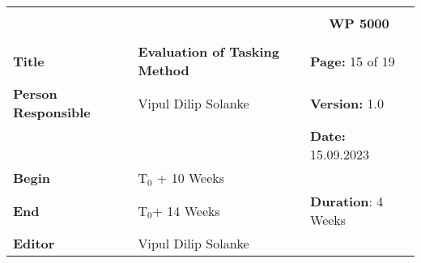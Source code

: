 \begin{table}[!h]
  \begin{center}
    \begin{tabular}{|p{35mm}||p{55mm}|p{50mm}||p{40mm}|}
      \hline
      \multicolumn{3}{|l||}{\textbf{}} & \multicolumn{1}{c|}{}                                                                                                                                                \\
      \multicolumn{3}{|l||}{\textbf{}} & \multicolumn{1}{c|}{\textbf{WP 5000}}                                                                                                                                \\
      \multicolumn{3}{|l||}{\textbf{}} & \multicolumn{1}{c|}{}                                                                                                                                                \\
      \hline\hline
      \textbf{Title}                   & \multicolumn{2}{p{7cm}||}{\textbf{Evaluation of Tasking Method}}
                                       & \textbf{Page:} 15 of 19                                                                                                                                              \\
      \hline
      \textbf{Person Responsible}        & \multicolumn{2}{l||}{Vipul Dilip Solanke}                                                                                                   & \textbf{Version:} 1.0   \\
      \hline
      \multicolumn{3}{|l||}{}          & \textbf{Date:} 15.09.2023                                                                                                                                          \\
      \hline\hline
      \textbf{Begin}                  & \multicolumn{2}{l||}{T$_0$ + 10 Weeks}                                                                                                                &                         \\
      \hline
      \textbf{End}                    & \multicolumn{2}{l||}{T$_0$+ 14 Weeks}                                                                                                        & \textbf{Duration}: 4 Weeks \\
      \hline\hline
      \textbf{Editor}              & \multicolumn{3}{l|}{Vipul Dilip Solanke}                                                                                                                              \\

\end{tabular}
\end{center}
\end{table}
